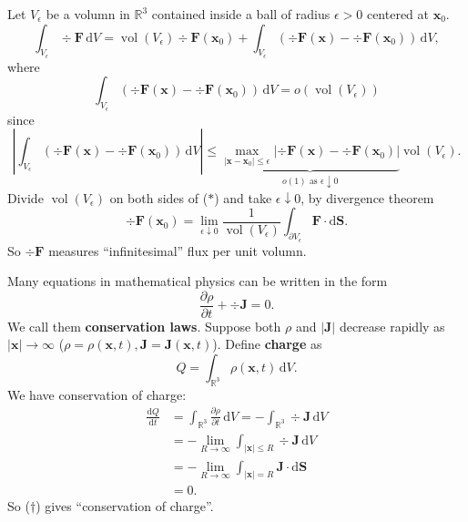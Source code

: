 \begin{example}
    Let $ V_\epsilon $ be a volumn in $ \mathbb{R}^{3} $ contained inside a ball of radius $ \epsilon>0 $ centered at $ \mathbf{x}_0 $.
    \[
        \int_{V_{\epsilon}} \div \mathbf{F} \,\mathrm{d}V = \operatorname{vol}(V_\epsilon)\div\mathbf{F}(\mathbf{x}_0)+\int_{V_\epsilon} (\div\mathbf{F}(\mathbf{x})-\div\mathbf{F}(\mathbf{x}_0)) \,\mathrm{d}V,\tag{$*$}
    \]
    where 
    \[
        \int_{V_\epsilon} (\div\mathbf{F}(\mathbf{x})-\div\mathbf{F}(\mathbf{x}_0)) \,\mathrm{d}V= o(\operatorname{vol}(V_\epsilon) )
    \]
    since 
    \[
        \left| \int_{V_\epsilon} (\div\mathbf{F}(\mathbf{x})-\div\mathbf{F}(\mathbf{x}_0)) \,\mathrm{d}V \right| \le \underbrace{\max_{|\mathbf{x}-\mathbf{x}_0|\le \epsilon} \left| \div\mathbf{F}(\mathbf{x})-\div\mathbf{F}(\mathbf{x}_0) \right|}_{o(1) \text{ as }\epsilon \downarrow 0} \operatorname{vol}(V_\epsilon) .
    \]
    Divide $ \operatorname{vol}(V_\epsilon)  $ on both sides of ($\ast$) and take $ \epsilon \downarrow 0 $, by divergence theorem 
    \[
        \div \mathbf{F}(\mathbf{x}_0) = \lim_{\epsilon \downarrow 0} \frac{1}{\operatorname{vol}(V_\epsilon) }  \int_{\partial V_{\epsilon}} \mathbf{F} \cdot\mathrm{d}\mathbf{S}.
    \]
    So $ \div\mathbf{F} $ measures ``infinitesimal'' flux per unit volumn.
\end{example}
\begin{example}
    Many equations in mathematical physics can be written in the form 
    \[
        \frac{\partial \rho}{\partial t}+ \div \mathbf{J} = 0. \tag{$ \dagger $}
    \]
    We call them \textbf{conservation laws}. Suppose both $ \rho $ and $ |\mathbf{J}| $ decrease rapidly as $ |\mathbf{x}|\to \infty $ ($ \rho=\rho(\mathbf{x},t),\mathbf{J}=\mathbf{J}(\mathbf{x},t) $). Define \textbf{charge} as 
    \[
        Q = \int_{\mathbb{R}^{3}} \rho(\mathbf{x},t) \,\mathrm{d}V.
    \]
    We have conservation of charge: 
    \begin{align*}
        \frac{\mathrm{d}Q}{\mathrm{d}t} &=  \int_{\mathbb{R}^{3}} \frac{\partial \rho}{\partial t}  \,\mathrm{d}V = -\int_{\mathbb{R}^{3}} \div\mathbf{J} \,\mathrm{d}V\\ 
        &= - \lim_{R \to \infty} \int_{|\mathbf{x}|\le R} \div\mathbf{J} \,\mathrm{d}V\\ 
        &= - \lim_{R \to \infty} \int_{|\mathbf{x}|=R} \mathbf{J} \cdot\mathrm{d}\mathbf{S}\\ 
        &= 0.
    \end{align*}
    So ($ \dagger $) gives ``conservation of charge''.
\end{example} 

